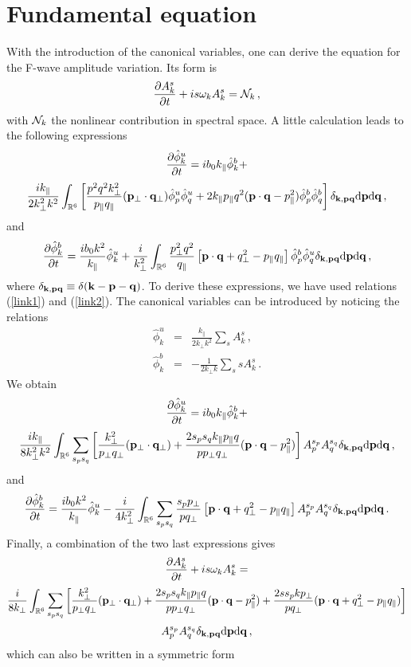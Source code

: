 \documentclass{jpp}
\def\be{\begin{equation}}
\def\ee{\end{equation}}
\def\ba{\begin{eqnarray}}
\def\ea{\end{eqnarray}}
\def\kk{{\bf k}}
\def\pp{{\bf p}}
\def\qq{{\bf q}}
\def\kpa{k_{\parallel}}
\def\ppa{p_{\parallel}}
\def\qpa{q_{\parallel}}
\def\kpe{k_{\perp}}
\def\ppe{p_{\perp}}
\def\qpe{q_{\perp}}
\def\ppeb{{\bf p_{\perp}}}
\def\qpeb{{\bf q_{\perp}}}
\def\dd{\mathrm{d}}
\begin{document}
\section{Fundamental equation}\label{Sec3}
With the introduction of the canonical variables, one can derive the equation for the F-wave amplitude variation. Its form is
\be
{\partial A_k^s \over \partial t} + i s \omega_k A_k^s = {\cal N}_k \, ,
\ee
with ${\cal N}_k$ the nonlinear contribution in spectral space. A little calculation leads to the following expressions
\be
{\partial \hat \phi^u_k \over \partial t} = i b_0 \kpa \hat \phi^b_k + 
\ee
$$
\frac{i \kpa}{2 \kpe^2 k^2} \int_{\mathbb{R}^6} \left[ \frac{p^2 q^2 \kpe^2}{\ppa \qpa} (\ppeb \cdot \qpeb) \hat \phi_p^u \hat \phi_q^u + 2 \kpa \ppa q^2 (\pp \cdot \qq - \ppa^2) \hat \phi_p^b \hat \phi_q^b \right] \delta_{\kk,\pp\qq} \dd \pp \dd \qq \, , 
$$
and 
\be
{\partial \hat \phi^b_k \over \partial t} = \frac{i b_0 k^2}{\kpa} \hat \phi^u_k + \frac{i}{\kpe^2} \int_{\mathbb{R}^6} \frac{ \ppe^2 q^2}{\qpa} 
\left[ \pp \cdot \qq + \qpe^2-\ppa \qpa \right] \hat \phi_p^b \hat \phi_q^u
\delta_{\kk,\pp\qq} \dd \pp \dd \qq \, , 
\ee
where $\delta_{\kk,\pp\qq} \equiv \delta(\kk-\pp-\qq)$. To derive these expressions, we have used relations (\ref{link1}) and (\ref{link2}). The canonical variables can be introduced by noticing the relations
\ba
\hat \phi^u_k &=& \frac{\kpa}{2\kpe k^2} \sum_s A_k^s \, ,\\
\hat \phi^b_k &=& -\frac{1}{2\kpe k} \sum_s s A_k^s \, .
\ea
We obtain
\be
{\partial \hat \phi^u_k \over \partial t} = i b_0 \kpa \hat \phi^b_k + 
\ee
$$
\frac{i \kpa}{8 \kpe^2 k^2} \int_{\mathbb{R}^6} \sum_{s_p s_q} 
\left[ \frac{\kpe^2}{\ppe \qpe} (\ppeb \cdot \qpeb) + \frac{2 s_p s_q \kpa \ppa q}{p\ppe \qpe} (\pp \cdot \qq - \ppa^2) \right] 
A_p^{s_p} A_q^{s_q} \delta_{\kk,\pp\qq} \dd \pp \dd \qq \, , 
$$
and 
\be
{\partial \hat \phi^b_k \over \partial t} = \frac{i b_0 k^2}{\kpa} \hat \phi^u_k - \frac{i}{4 \kpe^2} \int_{\mathbb{R}^6} \sum_{s_p s_q} \frac{s_p \ppe}{p\qpe}
\left[ \pp \cdot \qq + \qpe^2-\ppa \qpa \right] A_p^{s_p} A_q^{s_q} \delta_{\kk,\pp\qq} \dd \pp \dd \qq \, . 
\ee
Finally, a combination of the two last expressions gives
\be
{\partial A_k^s \over \partial t} + i s \omega_k A_k^s = 
\ee
$$
\frac{i}{8 \kpe} \int_{\mathbb{R}^6} \sum_{s_p s_q} 
\left[ \frac{\kpe^2}{\ppe \qpe} (\ppeb \cdot \qpeb) + \frac{2s_ps_q\kpa \ppa q}{p\ppe \qpe} (\pp \cdot \qq - \ppa^2)
+ \frac{2s s_p k \ppe}{p\qpe} (\pp \cdot \qq + \qpe^2-\ppa \qpa) \right] 
$$
$$A_p^{s_p} A_q^{s_q} \delta_{\kk,\pp\qq} \dd \pp \dd \qq \, ,$$
which can also be written in a symmetric form
\end{document}
